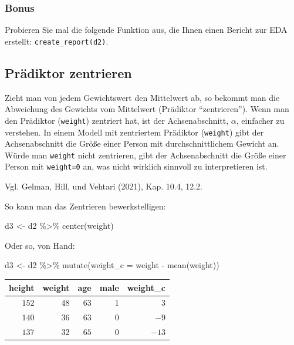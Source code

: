 \documentclass[
  a4paper,
  DIV=11]{scrreprt}
\newenvironment{Shaded}{\begin{snugshade}}{\end{snugshade}}
\newcommand{\AttributeTok}[1]{\textcolor[rgb]{0.40,0.45,0.13}{#1}}
\newcommand{\FunctionTok}[1]{\textcolor[rgb]{0.28,0.35,0.67}{#1}}
\newcommand{\NormalTok}[1]{\textcolor[rgb]{0.00,0.23,0.31}{#1}}
\newcommand{\OtherTok}[1]{\textcolor[rgb]{0.00,0.23,0.31}{#1}}
\newcommand{\SpecialCharTok}[1]{\textcolor[rgb]{0.37,0.37,0.37}{#1}}
\theoremstyle{definition}
\theoremstyle{remark}
\begin{document}
\hypertarget{bonus}{%
\subsubsection{Bonus}\label{bonus}}

Probieren Sie mal die folgende Funktion aus, die Ihnen einen Bericht zur
EDA erstellt: \texttt{create\_report(d2)}.

\hypertarget{pruxe4diktor-zentrieren}{%
\subsection{Prädiktor zentrieren}\label{pruxe4diktor-zentrieren}}

Zieht man von jedem Gewichtswert den Mittelwert ab, so bekommt man die
Abweichung des Gewichts vom Mittelwert (Prädiktor ``zentrieren''). Wenn
man den Prädiktor (\texttt{weight}) zentriert hat, ist der
Achsenabschnitt, \(\alpha\), einfacher zu verstehen. In einem Modell mit
zentriertem Prädiktor (\texttt{weight}) gibt der Achsenabschnitt die
Größe einer Person mit durchschnittlichem Gewicht an. Würde man
\texttt{weight} nicht zentrieren, gibt der Achsenabschnitt die Größe
einer Person mit \texttt{weight=0} an, was nicht wirklich sinnvoll zu
interpretieren ist.

Vgl. Gelman, Hill, und Vehtari (2021), Kap. 10.4, 12.2.

So kann man das Zentrieren bewerkstelligen:

\begin{Shaded}
\begin{Highlighting}[]
\NormalTok{d3 }\OtherTok{\textless{}{-}} 
\NormalTok{  d2 }\SpecialCharTok{\%\textgreater{}\%} 
  \FunctionTok{center}\NormalTok{(weight)}
\end{Highlighting}
\end{Shaded}

Oder so, von Hand:

\begin{Shaded}
\begin{Highlighting}[]
\NormalTok{d3 }\OtherTok{\textless{}{-}}
\NormalTok{  d2 }\SpecialCharTok{\%\textgreater{}\%} 
  \FunctionTok{mutate}\NormalTok{(}\AttributeTok{weight\_c =}\NormalTok{ weight }\SpecialCharTok{{-}} \FunctionTok{mean}\NormalTok{(weight))}
\end{Highlighting}
\end{Shaded}

\begin{longtable}{rrrrr}
\toprule
height & weight & age & male & weight\_c \\ 
\midrule
$152$ & $48$ & $63$ & $1$ & $3$ \\ 
$140$ & $36$ & $63$ & $0$ & $-9$ \\ 
$137$ & $32$ & $65$ & $0$ & $-13$ \\ 
\bottomrule
\end{longtable}
\end{document}
